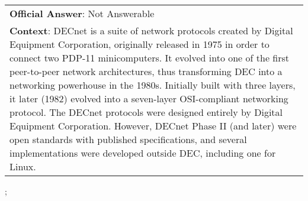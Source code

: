\begin{figure*}[ht]
{\begin{tabular}{p{}}
            \textbf{Official Answer}: Not Answerable                                                                                                                                                                                                                                                                                                                                                                                                                                                                                                                                                                                                                                                   \\
            \textbf{Context}: DECnet is a suite of network protocols created by Digital Equipment Corporation, originally released in 1975 in order to connect two PDP-11 minicomputers. It evolved into one of the first peer-to-peer network architectures, thus transforming DEC into a networking powerhouse in the 1980s. Initially built with three layers, it later (1982) evolved into a seven-layer OSI-compliant networking protocol. The DECnet protocols were designed entirely by Digital Equipment Corporation. However, DECnet Phase II (and later) were open standards with published specifications, and several implementations were developed outside DEC, including one for Linux. \\
        \end{tabular}
    };
    \label{fig:ex-5a551230134fea001a0e18d0}
\end{figure*}

